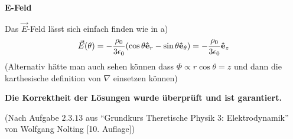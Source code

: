 \begin{enumerate}[label=\alph*)]
    \textbf{E-Feld}
    
    Das $\vec E$-Feld lässt sich einfach finden wie in a)
    \begin{equation}
      \vec E(\theta) = -\frac{\rho_0}{3\epsilon_0}
      \qty(\cos\theta \vu e_r - \sin\theta \vu e_\theta) 
      =-\frac{\rho_0}{3\epsilon_0}\vu e_z
    \end{equation}
    (Alternativ hätte man auch sehen können dass 
    $\Phi\propto r\cos\theta=z$ und dann die karthesische definition von
    $\nabla$ einsetzen können)

    \vfill
    \textbf{Die Korrektheit der Lösungen 
      wurde überprüft und ist garantiert.}

    (Nach Aufgabe $2.3.13$ aus
    ``Grundkurs Theretische Physik 3: Elektrodynamik'' von Wolfgang Nolting
    [10. Auflage])

\end{enumerate}

